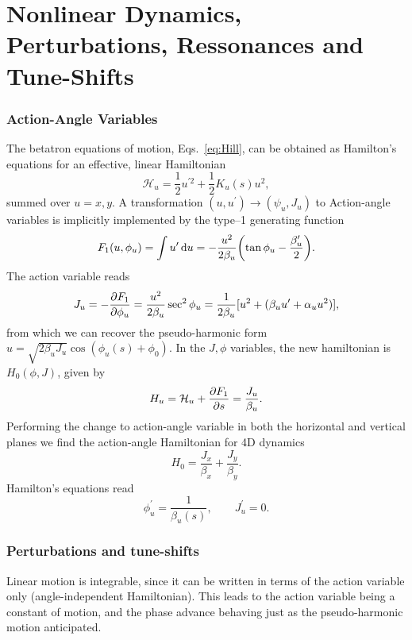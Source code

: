 \section{Nonlinear Dynamics, Perturbations, Ressonances and Tune-Shifts}

\subsubsection{Action-Angle Variables}
The betatron equations of motion, Eqs.~\eqref{eq:Hill}, can be obtained as Hamilton's equations for an effective, linear Hamiltonian
\begin{equation}
    \mathcal{H}_u=\frac{1}{2}u^{\prime2}+\frac{1}{2}K_u(s)u^2,
\end{equation}
summed over $u=x,y$.
A transformation $(u,u^\prime)\to(\psi_u, J_u)$ to Action-angle variables is implicitly implemented by the type--1 generating function \cite{lee_accelerator_2004}
\begin{equation}
    F_1(u,\phi_u)=\int{u}^\prime\dd{{u}}=-\frac{u^2}{2\beta_u}\qty(\tan \phi_u-\frac{\beta_u^\prime}{2}).
\end{equation}
The action variable reads
\begin{equation}
    J_u=-\pdv{F_1}{\phi_u} = \frac{u^2}{2\beta_u}\sec^2\phi_u = \frac{1}{2\beta_u}[u^2 + (\beta_u u^\prime + \alpha_u u^2)],
    \label{eq:action}
\end{equation}
from which we can recover the pseudo-harmonic form $u=\sqrt{2\beta_u J_u}\cos(\phi_u(s)+\phi_0)$. In the $J,\phi$ variables, the new hamiltonian is $H_0(\phi, J)$,  given by
\begin{equation}
    H_u=\mathcal{H}_u+\pdv{F_1}{s} = \frac{J_u}{\beta_u}.
\end{equation}
Performing the change to action-angle variable in both the horizontal and vertical planes we find the action-angle Hamiltonian for 4D dynamics
\begin{equation}
    H_0= \frac{J_x}{\beta_x} +  \frac{J_y}{\beta_y}.
\end{equation}
Hamilton's equations read
\begin{equation}
    \phi_u^\prime = \frac{1}{\beta_u(s)},\qquad J_u^\prime=0.
\end{equation}
\subsubsection{Perturbations and tune-shifts}
Linear motion is integrable, since it can be written in terms of the action variable only (angle-independent Hamiltonian). This leads to the action variable being a constant of motion, and the phase advance behaving just as the pseudo-harmonic motion anticipated.

